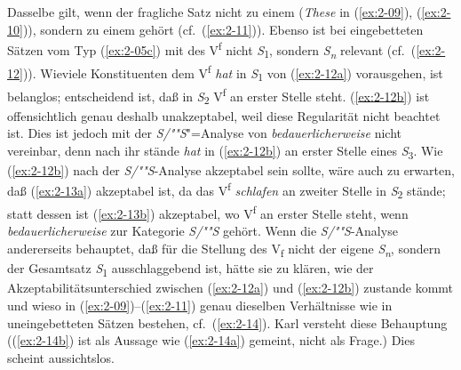 \documentclass[output=paper]{langsci/langscibook}
\begin{document}
Dasselbe gilt, wenn der fragliche Satz nicht zu einem  (\textit{These} in (\ref{ex:2-09}), (\ref{ex:2-10})), sondern zu einem  gehört (cf.\ (\ref{ex:2-11})).
\eal \label{ex:2-11}
	\label{ex:2-11a} 
	 \label{ex:2-11b}
	 \label{ex:2-11c}
\zl 
Ebenso ist bei eingebetteten Sätzen vom Typ (\ref{ex:2-05c}) mit  des V\textsuperscript{f} nicht \textit{S}\textsubscript{1}, sondern \textit{S\textsubscript{n}} relevant (cf.\ (\ref{ex:2-12})). Wieviele Konstituenten dem V\textsuperscript{f} \textit{hat} in \textit{S}\textsubscript{1} von (\ref{ex:2-12a}) vorausgehen, ist belanglos; entscheidend ist, daß in \textit{S}\textsubscript{2} V\textsuperscript{f} an erster Stelle steht.
\eal \label{ex:2-12}
	 \label{ex:2-12a} 
	 \label{ex:2-12b}
\zl 
(\ref{ex:2-12b}) ist offensichtlich genau deshalb unakzeptabel, weil diese Regularität nicht beachtet ist. Dies ist jedoch mit der \textit{S/""S}"=Analyse von \textit{bedauerlicherweise} nicht vereinbar, denn nach ihr stände \textit{hat} in (\ref{ex:2-12b}) an erster Stelle eines \textit{S}\textsubscript{3}. Wie (\ref{ex:2-12b}) nach der \textit{S/""S}-Analyse akzeptabel sein sollte, wäre auch zu erwarten, daß (\ref{ex:2-13a}) akzeptabel ist, da das V\textsuperscript{f} \textit{schlafen} an zweiter Stelle in \textit{S}\textsubscript{2} stände; statt dessen ist (\ref{ex:2-13b}) akzeptabel, wo V\textsuperscript{f} an erster Stelle steht, wenn \textit{bedauerlicherweise} zur Kategorie \textit{S/""S} gehört.
\eal
	 \label{ex:2-13a}
	\label{ex:2-13b} 
\zl 
Wenn die \textit{S/""S}-Analyse andererseits behauptet, daß für die Stellung des V\textsubscript{f} nicht der eigene \textit{S\textsubscript{n}}, sondern der Gesamtsatz \textit{S}\textsubscript{1} ausschlaggebend ist, hätte sie zu klären, wie der Akzeptabilitätsunterschied zwischen (\ref{ex:2-12a}) und (\ref{ex:2-12b}) zustande kommt und wieso in (\ref{ex:2-09})--(\ref{ex:2-11}) genau dieselben Verhältnisse wie in uneingebetteten Sätzen bestehen, cf.\ (\ref{ex:2-14}).
\eal \label{ex:2-14}
	\ex Karl versteht diese Behauptung \label{ex:2-14a}
	 \label{ex:2-14b}
	 \label{ex:2-14c}
\zl
((\ref{ex:2-14b}) ist als Aussage wie (\ref{ex:2-14a}) gemeint, nicht als Frage.) Dies scheint aussichtslos.
\end{document}
